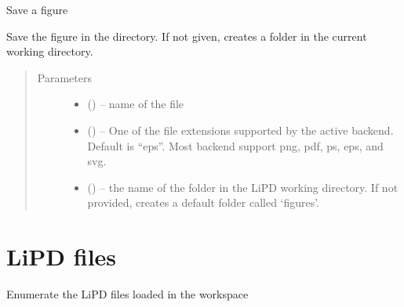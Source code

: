 \documentclass[letterpaper,10pt,english]{sphinxmanual}
\begin{document}

\begin{fulllineitems}
\label{\detokenize{LipdUtils:pyleoclim.LipdUtils.saveFigure}}
Save a figure

Save the figure in the directory. If not given, creates a folder in the
current working directory.
\begin{quote}\begin{description}
\item[{Parameters}] \leavevmode\begin{itemize}
\item {} 
 () -- name of the file

\item {} 
 () -- One of the file extensions supported by the active
backend. Default is ``eps''. Most backend support png, pdf, ps, eps,
and svg.

\item {} 
 () -- the name of the folder in the LiPD working directory.
If not provided, creates a default folder called `figures'.

\end{itemize}

\end{description}\end{quote}

\end{fulllineitems}



\section{LiPD files}
\label{\detokenize{LipdUtils:lipd-files}}

\begin{fulllineitems}
\label{\detokenize{LipdUtils:pyleoclim.LipdUtils.enumerateLipds}}
Enumerate the LiPD files loaded in the workspace

\end{fulllineitems}
\end{document}

